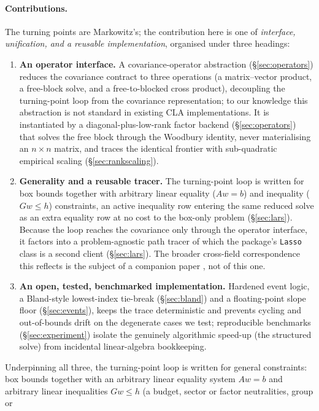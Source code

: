 \documentclass[11pt]{article}
\begin{document}
\paragraph{Contributions.}
The turning points are Markowitz's; the contribution here is one of
\emph{interface, unification, and a reusable implementation}, organised under three
headings:
\begin{enumerate}\setlength{\itemsep}{2pt}
\item \textbf{An operator interface.} A covariance-operator abstraction
(\S\ref{sec:operators}) reduces the covariance contract to three operations (a
matrix--vector product, a free-block solve, and a free-to-blocked cross product),
decoupling the turning-point loop from the covariance representation; to our
knowledge this abstraction is not standard in existing CLA implementations. It is
instantiated by a diagonal-plus-low-rank factor backend (\S\ref{sec:operators})
that solves the free block through the Woodbury identity, never materialising an
$n\times n$ matrix, and traces the identical frontier with sub-quadratic empirical
scaling (\S\ref{sec:rankscaling}).
\item \textbf{Generality and a reusable tracer.} The turning-point loop is written for
box bounds together with arbitrary linear equality ($A w = b$) and inequality
($G w \le h$) constraints, an active inequality row entering the same reduced solve as
an extra equality row at no cost to the box-only problem (\S\ref{sec:lars}). Because the
loop reaches the covariance only through the operator interface, it factors into a
problem-agnostic path tracer of which the package's \texttt{Lasso} class is a second
client (\S\ref{sec:lars}). The broader cross-field correspondence this reflects is the
subject of a companion paper \citep{schmelzer2026perspective}, not of this one.
\item \textbf{An open, tested, benchmarked implementation.} Hardened event logic, a
Bland-style lowest-index tie-break (\S\ref{sec:bland}) and a floating-point slope
floor (\S\ref{sec:events}), keeps the trace deterministic and prevents cycling and
out-of-bounds drift on the degenerate cases we test; reproducible benchmarks
(\S\ref{sec:experiment}) isolate the
genuinely algorithmic speed-up (the structured solve) from incidental
linear-algebra bookkeeping.
\end{enumerate}
Underpinning all three, the turning-point loop is written for general constraints:
box bounds together with an arbitrary linear equality system $A w = b$ and arbitrary
linear inequalities $G w \le h$ (a budget, sector or factor neutralities, group or
\end{document}
